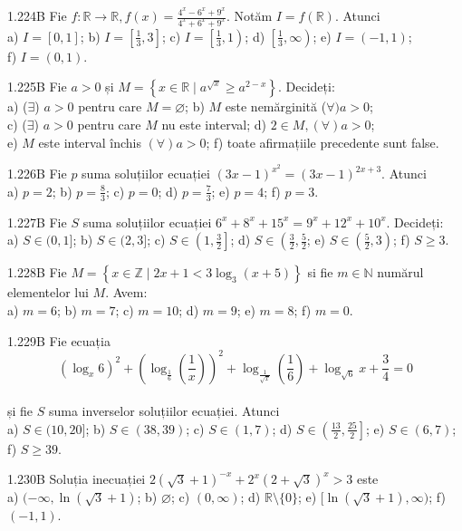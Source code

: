 \documentclass[11pt]{article}
\begin{document}
1.224B Fie $f: \mathbb{R} \rightarrow \mathbb{R}, f(x)=\frac{4^{x}-6^{x}+9^{x}}{4^{x}+6^{x}+9^{x}}$. Notăm $I=f(\mathbb{R})$. Atunci\\ a) $I=[0,1]$; b) $I=\left[\frac{1}{3}, 3\right]$; c) $I=\left[\frac{1}{3}, 1\right)$; d) $\left[\frac{1}{3}, \infty\right)$; e) $I=(-1,1)$;\\ f) $I=(0,1)$.

1.225B Fie $a>0$ și $M=\left\{x \in \mathbb{R} \mid a^{\sqrt{x}} \geq a^{2-x}\right\}$. Decideți:\\ a) ($\exists$) $a>0$ pentru care $M=\varnothing$; b) $M$ este nemărginită ($\forall) a>0$;\\ c) ($\exists$) $a>0$ pentru care $M$ nu este interval; d) $2 \in M,(\forall) a>0$;\\ e) $M$ este interval închis $(\forall) a>0$; f) toate afirmațiile precedente sunt false.

1.226B Fie $p$ suma soluțiilor ecuației $(3 x-1)^{x^{2}}=(3 x-1)^{2 x+3}$. Atunci\\ a) $p=2$; b) $p=\frac{8}{3}$; c) $p=0$; d) $p=\frac{7}{3}$; e) $p=4$; f) $p=3$.

1.227B Fie $S$ suma soluțiilor ecuației $6^{x}+8^{x}+15^{x}=9^{x}+12^{x}+10^{x}$. Decideți:\\ a) $S \in(0,1]$; b) $S \in(2,3]$; c) $S \in\left(1, \frac{3}{2}\right]$; d) $S \in\left(\frac{3}{2}, \frac{5}{2}\right.$; e) $S \in\left(\frac{5}{2}, 3\right)$; f) $S \geq 3$.

1.228B Fie $M=\left\{x \in \mathbb{Z} \mid 2 x+1<3 \log _{3}(x+5)\right\}$ si fie $m \in \mathbb{N}$ numărul elementelor lui $M$. Avem:\\ a) $m=6$; b) $m=7$; c) $m=10$; d) $m=9$; e) $m=8$; f) $m=0$.

1.229B Fie ecuația $$\left(\log _{x} 6\right)^{2}+\left(\log _{\frac{1}{6}}\left(\frac{1}{x}\right)\right)^{2}+\log _{\frac{1}{\sqrt{x}}}\left(\frac{1}{6}\right)+\log _{\sqrt{6}} x+\frac{3}{4}=0$$\\ și fie $S$ suma inverselor soluțiilor ecuației. Atunci\\ a) $S \in(10,20]$; b) $S \in(38,39)$; c) $S \in(1,7)$; d) $S \in\left(\frac{13}{2}, \frac{25}{2}\right]$; e) $S \in(6,7)$; f) $S \geq 39$.

1.230B Soluția inecuației $2(\sqrt{3}+1)^{-x}+2^{x}(2+\sqrt{3})^{x}>3$ este\\ a) $(-\infty, \ln (\sqrt{3}+1)$; b) $\varnothing$; c) $(0, \infty)$; d) $\mathbb{R} \setminus\{0\}$; e) $[\ln (\sqrt{3}+1), \infty)$; f) $(-1,1)$.
\end{document}
